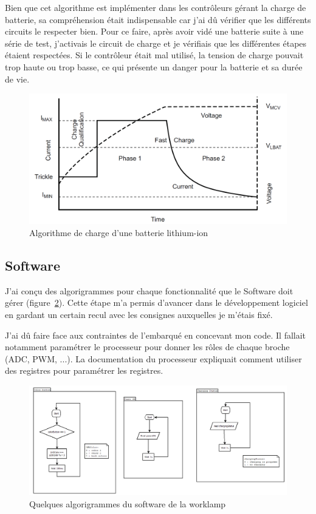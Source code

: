 \documentclass[a4paper, 12pt, sffamily]{report}
\begin{document}
Bien que cet algorithme est implémenter dans les contrôleurs gérant la charge de batterie, sa compréhension était indispensable car j'ai dû vérifier que les différents circuits le respecter bien. Pour ce faire, après avoir vidé une batterie suite à une série de test, j'activais le circuit de charge et je vérifiais que les différentes étapes étaient respectées. Si le contrôleur était mal utilisé, la tension de charge pouvait trop haute ou trop basse, ce qui présente un danger pour la batterie et sa durée de vie.



\begin{figure}[H]
\centering
\includegraphics[scale=0.65]{figures/screenshots/Li-ion_charge_algortihm.png}
\caption{Algorithme de charge d’une batterie lithium-ion \cite{BQ2000_datasheet}} 
\label{fig:li-ion_charge}
\end{figure}

\subsection{Software}
J'ai conçu des algorigrammes pour chaque fonctionnalité que le Software doit gérer (figure~\ref{fig:flow_chart}). Cette étape m'a permis d'avancer dans le développement logiciel en gardant un certain recul avec les consignes auxquelles je m'étais fixé.

J'ai dû faire face aux contraintes de l'embarqué en concevant mon code. Il fallait notamment paramétrer le processeur pour donner les rôles de chaque broche (ADC, PWM, ...). La documentation du processeur expliquait comment utiliser des registres pour paramétrer les registres. 

\begin{figure}[H]
\centering
\includegraphics[scale=0.7]{figures/screenshots/flow_chart.png}
\caption{Quelques algorigrammes du software de la worklamp} 
\label{fig:flow_chart}
\end{figure}
\end{document}
